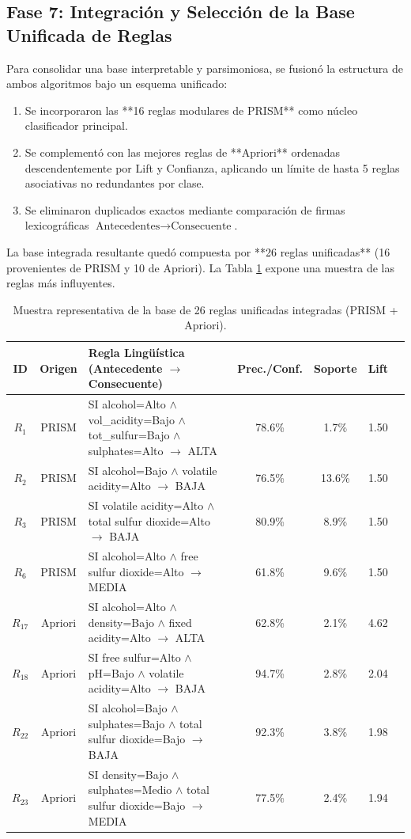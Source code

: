 \documentclass[11pt,a4paper]{article}
\begin{document}
\subsection{Fase 7: Integración y Selección de la Base Unificada de Reglas}
Para consolidar una base interpretable y parsimoniosa, se fusionó la estructura de ambos algoritmos bajo un esquema unificado:
\begin{enumerate}[noitemsep]
    \item Se incorporaron las **16 reglas modulares de PRISM** como núcleo clasificador principal.
    \item Se complementó con las mejores reglas de **Apriori** ordenadas descendentemente por Lift y Confianza, aplicando un límite de hasta 5 reglas asociativas no redundantes por clase.
    \item Se eliminaron duplicados exactos mediante comparación de firmas lexicográficas $\text{Antecedentes} \to \text{Consecuente}$.
\end{enumerate}

La base integrada resultante quedó compuesta por **26 reglas unificadas** (16 provenientes de PRISM y 10 de Apriori). La Tabla \ref{tab:reglas_muestra} expone una muestra de las reglas más influyentes.

\begin{table}[H]
\centering
\caption{Muestra representativa de la base de 26 reglas unificadas integradas (PRISM + Apriori).}
\label{tab:reglas_muestra}
\small
\begin{tabular}{cclcccc}
\toprule
\textbf{ID} & \textbf{Origen} & \textbf{Regla Lingüística (Antecedente $\to$ Consecuente)} & \textbf{Prec./Conf.} & \textbf{Soporte} & \textbf{Lift} \\
\midrule
$R_{1}$ & PRISM & SI alcohol=Alto $\land$ vol\_acidity=Bajo $\land$ tot\_sulfur=Bajo $\land$ sulphates=Alto $\to$ ALTA & 78.6\% & 1.7\% & 1.50 \\
$R_{2}$ & PRISM & SI alcohol=Bajo $\land$ volatile acidity=Alto $\to$ BAJA & 76.5\% & 13.6\% & 1.50 \\
$R_{3}$ & PRISM & SI volatile acidity=Alto $\land$ total sulfur dioxide=Alto $\to$ BAJA & 80.9\% & 8.9\% & 1.50 \\
$R_{6}$ & PRISM & SI alcohol=Alto $\land$ free sulfur dioxide=Alto $\to$ MEDIA & 61.8\% & 9.6\% & 1.50 \\
$R_{17}$ & Apriori & SI alcohol=Alto $\land$ density=Bajo $\land$ fixed acidity=Alto $\to$ ALTA & 62.8\% & 2.1\% & 4.62 \\
$R_{18}$ & Apriori & SI free sulfur=Alto $\land$ pH=Bajo $\land$ volatile acidity=Alto $\to$ BAJA & 94.7\% & 2.8\% & 2.04 \\
$R_{22}$ & Apriori & SI alcohol=Bajo $\land$ sulphates=Bajo $\land$ total sulfur dioxide=Bajo $\to$ BAJA & 92.3\% & 3.8\% & 1.98 \\
$R_{23}$ & Apriori & SI density=Bajo $\land$ sulphates=Medio $\land$ total sulfur dioxide=Bajo $\to$ MEDIA & 77.5\% & 2.4\% & 1.94 \\
\bottomrule
\end{tabular}
\end{table}
\end{document}
